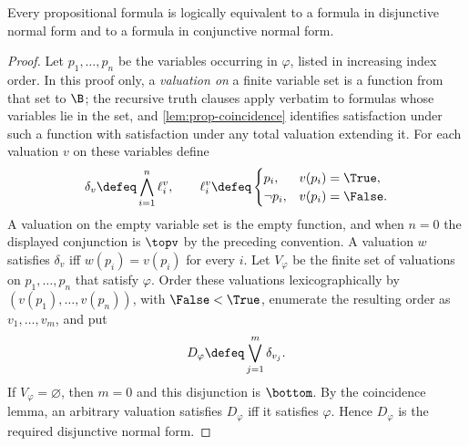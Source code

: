 \begin{theorem}
\label{thm:prop-normal-forms}
Every propositional formula is logically equivalent to a formula in
disjunctive normal form and to a formula in conjunctive normal form.
\end{theorem}
\begin{proof}
Let \(p_1,\ldots,p_n\) be the variables occurring in \(\varphi\), listed in
increasing index order.  In this
proof only, a \emph{valuation on} a finite variable set is a function from
that set to \(\B\); the recursive truth clauses apply verbatim to formulas
whose variables lie in the set, and \cref{lem:prop-coincidence} identifies
satisfaction under such a function with satisfaction under any total
valuation extending it.  For each
valuation \(v\) on these variables define
\[
  \delta_v\defeq\bigwedge_{i=1}^{n}\ell_i^v,
  \qquad
  \ell_i^v\defeq
  \begin{cases}
    p_i,&v(p_i)=\True,\\
    \neg p_i,&v(p_i)=\False.
  \end{cases}
\]
A valuation on the empty variable set is the empty function, and when
\(n=0\) the displayed conjunction is \(\topv\) by the preceding convention.
A valuation \(w\) satisfies \(\delta_v\) iff \(w(p_i)=v(p_i)\) for every
\(i\).  Let \(V_{\varphi}\) be the finite set of valuations on
\(p_1,\ldots,p_n\) that satisfy \(\varphi\).  Order these valuations
lexicographically by
\((v(p_1),\ldots,v(p_n))\), with \(\False<\True\), enumerate the resulting
order as \(v_1,\ldots,v_m\), and put
\[
  D_{\varphi}\defeq\bigvee_{j=1}^{m}\delta_{v_j}.
\]
If \(V_{\varphi}=\varnothing\), then \(m=0\) and this disjunction is
\(\bottom\).  By the
coincidence lemma, an arbitrary valuation satisfies \(D_{\varphi}\) iff
it satisfies \(\varphi\).  Hence \(D_{\varphi}\) is the required
disjunctive normal form.


\end{proof}
